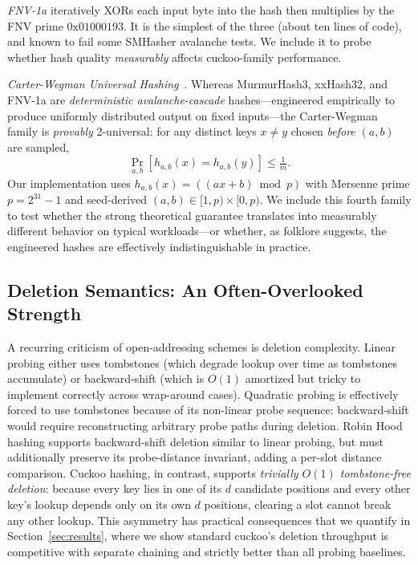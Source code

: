 \documentclass[10pt,journal,compsoc]{IEEEtran}
\begin{document}
\emph{FNV-1a} iteratively XORs each input byte into the hash then multiplies by the FNV prime $\text{0x01000193}$. It is the simplest of the three (about ten lines of code), and known to fail some SMHasher avalanche tests. We include it to probe whether hash quality \emph{measurably} affects cuckoo-family performance.

\emph{Carter-Wegman Universal Hashing}~\cite{carter1979universal}. Whereas MurmurHash3, xxHash32, and FNV-1a are \emph{deterministic avalanche-cascade} hashes---engineered empirically to produce uniformly distributed output on fixed inputs---the Carter-Wegman family is \emph{provably} 2-universal: for any distinct keys $x \neq y$ chosen \emph{before} $(a, b)$ are sampled,
\[
\Pr_{a,b}\!\left[h_{a,b}(x) = h_{a,b}(y)\right] \leq \tfrac{1}{m}.
\]
Our implementation uses $h_{a,b}(x) = ((a x + b) \bmod p)$ with Mersenne prime $p = 2^{31}-1$ and seed-derived $(a, b) \in [1, p) \times [0, p)$. We include this fourth family to test whether the strong theoretical guarantee translates into measurably different behavior on typical workloads---or whether, as folklore suggests, the engineered hashes are effectively indistinguishable in practice.

\subsection{Deletion Semantics: An Often-Overlooked Strength}
A recurring criticism of open-addressing schemes is deletion complexity. Linear probing either uses tombstones (which degrade lookup over time as tombstones accumulate) or backward-shift (which is $O(1)$ amortized but tricky to implement correctly across wrap-around cases). Quadratic probing is effectively forced to use tombstones because of its non-linear probe sequence: backward-shift would require reconstructing arbitrary probe paths during deletion. Robin Hood hashing supports backward-shift deletion similar to linear probing, but must additionally preserve its probe-distance invariant, adding a per-slot distance comparison. Cuckoo hashing, in contrast, supports \emph{trivially $O(1)$ tombstone-free deletion}: because every key lies in one of its $d$ candidate positions and every other key's lookup depends only on its own $d$ positions, clearing a slot cannot break any other lookup. This asymmetry has practical consequences that we quantify in Section~\ref{sec:results}, where we show standard cuckoo's deletion throughput is competitive with separate chaining and strictly better than all probing baselines.
\end{document}
